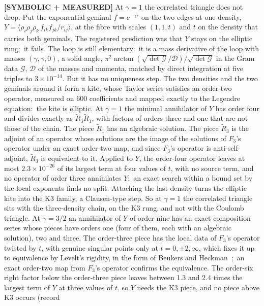 \documentclass[aps,pra,twocolumn,superscriptaddress,longbibliography]{revtex4-2}
\begin{document}
\textbf{[SYMBOLIC + MEASURED]} At $\gamma=1$ the correlated triangle does not drop.  Put
the exponential geminal $f=e^{-\gamma r}$ on the two edges at one density,
$Y=\langle\rho_i\rho_j\rho_k\,f_{ik}f_{jk}/r_{ij}\rangle$, at the fibre with
scales $(1,1,t)$ and $t$ on the density that carries both geminals.  The
registered prediction was that $Y$ stays on the elliptic rung;\ it fails.  The loop is
still elementary:\ it is a mass derivative of the loop with masses
$(\gamma,\gamma,0)$, a solid angle,
$\pi^2\arctan(\sqrt{\det\mathcal{G}}/\mathcal{D})/\sqrt{\det\mathcal{G}}$ in the Gram data $\mathcal{G}$, $\mathcal{D}$ of the masses
and momenta, matched by direct integration at five triples to
$3\times10^{-14}$.  But it has no uniqueness step.  The two densities and
the two geminals around it form a kite, whose Taylor series satisfies an
order-two operator, measured on 600 coefficients and mapped exactly to the
Legendre equation:\ the kite is elliptic.  At $\gamma=1$ the minimal
annihilator of $Y$ has order four and divides exactly as $\tilde R_3\tilde R_1$,
with factors of orders three and one that are not those of the chain.  The
piece $\tilde R_1$ has an algebraic solution.  The piece $\tilde R_3$ is the adjoint of an
operator whose solutions are the image of the solutions of $F_3$'s operator
under an exact order-two map, and since $F_3$'s operator is anti-self-adjoint,
$\tilde R_3$ is equivalent to it.  Applied to $Y$, the order-four operator leaves at
most $2.3\times10^{-26}$ of its largest term at four values of $t$, with no
source term, and no operator of order three annihilates $Y$:\ an exact
search within a bound set by the local exponents finds no split.  Attaching the
last density turns the elliptic kite into the K3 family, a Clausen-type
step.  So at $\gamma=1$ the correlated triangle sits with the three-density chain, on the
K3 rung, and not with the Coulomb triangle.  At $\gamma=3/2$ an annihilator of $Y$ of order nine
has an exact composition series whose pieces have orders one (four of
them, each with an algebraic solution), two and three.  The order-three
piece has the local data of $F_3$'s operator twisted by $t$, with genuine
singular points only at $t=0,\pm2,\infty$, which fixes it up to
equivalence by Levelt's rigidity, in the form of Beukers and
Heckman~\cite{beukers_heckman1989};\ an exact order-two map from $F_3$'s
operator confirms the equivalence. The order-six right factor below the order-three piece
leaves between 1.3 and 2.4 times the largest term of $Y$ at three values
of $t$, so $Y$ needs the K3 piece, and no piece above K3 occurs (record
\end{document}
